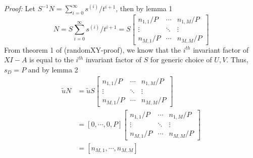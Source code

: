 \documentclass[12pt]{article}
\begin{document}
\noindent\textit{Proof:} Let $S^{-1}N = \sum_{i=0}^{\infty} s^{(i)}/t^{i+1}$, 
then by lemma 1 
$$ N = S \sum_{i=0}^{\infty} s^{(i)}/t^{i+1} = S 
\begin{bmatrix}
n_{1,1} / P & \cdots & n_{1,M} / P \\
\vdots      & \ddots & \vdots \\
n_{M,1} / P & \cdots & n_{M,M} / P
\end{bmatrix}
$$
From theorem 1 of (randomXY-proof), we know that the $i^{th}$ invariant factor of
$XI - A$ is equal to the $i^{th}$ invariant factor of $S$ for generic choice of
$U,V$. Thus, $s_D = P$ and by lemma 2
\begin{align*}
\tilde{u} N &= \tilde{u} S
				\begin{bmatrix}
				n_{1,1} / P & \cdots & n_{1,M} / P \\
				\vdots            & \ddots & \vdots \\
				n_{M,1} / P & \cdots & n_{M,M} / P
				\end{bmatrix} \\
            &= [0,\cdots,0,P]
               \begin{bmatrix}
               n_{1,1} / P & \cdots & n_{1,M} / P \\
               \vdots            & \ddots & \vdots \\
               n_{M,1} / P & \cdots & n_{M,M} / P
               \end{bmatrix}\\
            &= [n_{M,1} , \cdots , n_{M,M}]
\end{align*}
\end{document}
